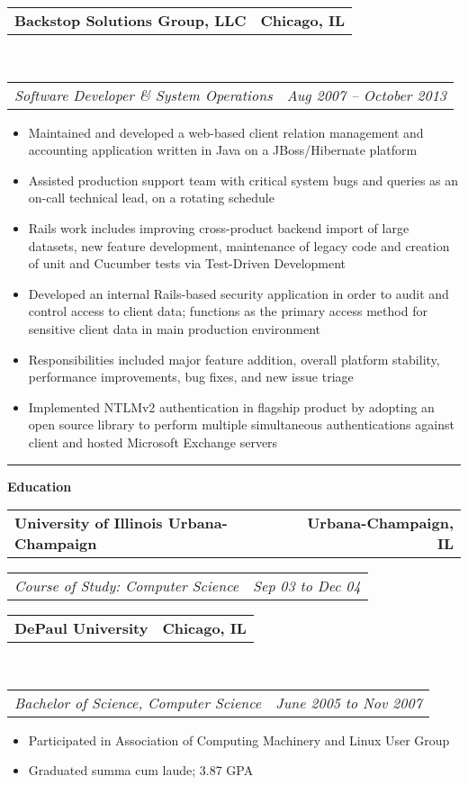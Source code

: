 \documentclass[10pt,letterpaper]{article}
\makeatletter
\newcommand{\headerrow}[2]
{\begin{tabular*}{\linewidth}{l@{\extracolsep{\fill}}r}
	#1 &
	#2 \\
\end{tabular*}}
\newenvironment{indentsection}[1]%
{\begin{list}{}%
	{\setlength{\leftmargin}{#1}}%
	\item[]%
}
{\end{list}}
\makeatother
\begin{document}
\begin{indentsection}{\parindent}
	\headerrow
		{\textbf{Backstop Solutions Group, LLC} }
		{\textbf{Chicago, IL}}
	\\
	\headerrow
		{\emph{Software Developer \& System Operations}}
		{\emph{Aug 2007 -- October 2013}}

	\begin{itemize}
	\renewcommand{\labelitemi}{$-$}
	\vspace{-0.1in}
		\item Maintained and developed a web-based client relation management and accounting application written in Java on a JBoss/Hibernate platform
		\item Assisted production support team with critical system bugs and queries as an on-call technical lead, on a rotating schedule
    \item Rails work includes improving cross-product backend import of large datasets, new feature development, maintenance of legacy code and creation of unit and Cucumber tests via Test-Driven Development
		\item Developed an internal Rails-based security application in order to audit and control access to client data; functions as the primary access method for sensitive client data in main production environment
    \item Responsibilities included major feature addition, overall platform stability, performance improvements, bug fixes, and new issue triage
    \item Implemented NTLMv2 authentication in flagship product by adopting an open source library to perform multiple simultaneous authentications against client and hosted Microsoft Exchange servers
	\end{itemize}
\end{indentsection}
\vspace{0.1in}
\hrule
\vspace{0.2in}
{\large \textbf{Education}}
\begin{indentsection}{\parindent}
  \headerrow
		{\textbf{University of Illinois Urbana-Champaign}}
		{\textbf{Urbana-Champaign, IL}}
\vspace{0.1in}
  \headerrow
		{\emph{Course of Study: Computer Science}}
		{\emph{Sep 03 to Dec 04}}
	\headerrow
		{\textbf{DePaul University}}
		{\textbf{Chicago, IL}}
	\\
	\headerrow
		{\emph{Bachelor of Science, Computer Science}}
		{\emph{June 2005 to Nov 2007}}
  \begin{itemize}
  \renewcommand{\labelitemi}{$-$}
    \vspace{-0.1in}
    \item Participated in Association of Computing Machinery and Linux User Group
    \item Graduated summa cum laude; 3.87 GPA
  \end{itemize}

\end{indentsection}
\end{document}
